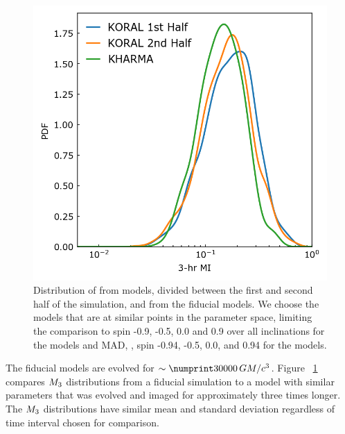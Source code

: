 \begin{figure}
  \centering
  \includegraphics[width=\columnwidth]{./figures/Koral_vs_IL_MI.png}
  \caption{Distribution of  from \koral models, divided between the first and second half of the simulation, and from the fiducial \kharma models. We choose the models that are at similar points in the parameter space, limiting the comparison to spin -0.9, -0.5, 0.0 and 0.9 over all inclinations for the \koral models and MAD, , spin -0.94, -0.5, 0.0, and 0.94 for the \kharma models.}
  \label{fig:koral_MI}
\end{figure}

The fiducial models are evolved for $\sim \no{30000}\,\tg$.
Figure ~\ref{fig:koral_MI} compares $M_{3}$ distributions from a fiducial \kharma simulation to a \koral model with similar parameters that was evolved and imaged for approximately three times longer.
The $M_{3}$ distributions have similar mean and standard deviation regardless of time interval chosen for comparison.

